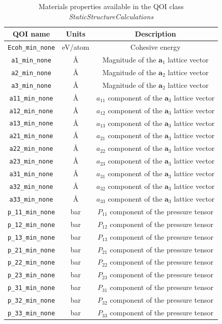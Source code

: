 \begin{table}[ht]
	\centering
	\caption{Materials properties available in the QOI class \emph{StaticStructureCalculations}}
	\label{tbl:pypospack_qoi_lmps_min_none}
	\begin{tabular}{ccc}
		\hline
		QOI name & Units & Description \\
		\hline
	  \verb|Ecoh_min_none|
			& eV/atom
			& Cohesive energy\\
    \verb|a1_min_none|
		  & \AA
			& Magnitude of the $\bm{a}_1$ lattice vector \\
		\verb|a2_min_none|
			& \AA
			& Magnitude of the $\bm{a}_2$ lattice vector \\
		\verb|a3_min_none|
			& \AA
			& Magnitude of the $\bm{a}_2$ lattice vector \\
    \verb|a11_min_none|
			& \AA
			& $a_{11}$ component of the $\bm{a}_3$ lattice vector \\
		\verb|a12_min_none|
			& \AA
			& $a_{12}$ component of the $\bm{a}_3$ lattice vector \\
		\verb|a13_min_none|
			& \AA
			& $a_{13}$ component of the $\bm{a}_3$ lattice vector \\
    \verb|a21_min_none|
			& \AA
			& $a_{21}$ component of the $\bm{a}_3$ lattice vector \\
		\verb|a22_min_none|
			& \AA
			& $a_{22}$ component of the $\bm{a}_3$ lattice vector \\
		\verb|a23_min_none|
			& \AA
			& $a_{23}$ component of the $\bm{a}_3$ lattice vector \\
		\verb|a31_min_none|
			& \AA
			& $a_{31}$ component of the $\bm{a}_3$ lattice vector \\
		\verb|a32_min_none|
			& \AA
			& $a_{32}$ component of the $\bm{a}_3$ lattice vector \\
		\verb|a33_min_none|
			& \AA
			& $a_{33}$ component of the $\bm{a}_3$ lattice vector \\
		\verb|p_11_min_none|
			& bar
			& $P_{11}$ component of the pressure tensor \\
		\verb|p_12_min_none|
			& bar
			& $P_{12}$ component of the pressure tensor \\
		\verb|p_13_min_none|
			& bar
			& $P_{13}$ component of the pressure tensor \\
		\verb|p_21_min_none|
			& bar
			& $P_{21}$ component of the pressure tensor \\
		\verb|p_22_min_none|
			& bar
			& $P_{22}$ component of the pressure tensor \\
		\verb|p_23_min_none|
			& bar
			& $P_{23}$ component of the pressure tensor \\
    \verb|p_31_min_none|
		  & bar
			& $P_{31}$ component of the pressure tensor \\
		\verb|p_32_min_none|
			& bar
			& $P_{32}$ component of the pressure tensor \\
		\verb|p_33_min_none|
			& bar
			& $P_{33}$ component of the pressure tensor \\
		\hline
	\end{tabular}
\end{table}

